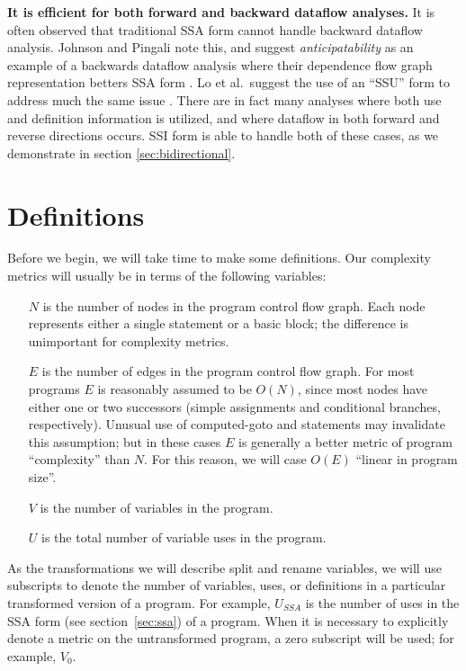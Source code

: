 \documentclass[12pt,titlepage,twoside]{article}
\let\oldsection\section
\renewcommand{\section}{\setcounter{figure}{0}\setcounter{table}{0}\oldsection}
\begin{document}
\textbf{It is efficient for both forward and backward dataflow analyses.}
It is often observed that traditional SSA form cannot handle backward
dataflow analysis.  Johnson and Pingali note this, and suggest
\emph{anticipatability} as an example of a backwards dataflow analysis
where their dependence flow graph representation betters SSA form
\cite{johnson93:dfg}. Lo et al.\ suggest the use of an ``SSU'' form to
address much the same issue \cite{lo98:ssu}.  There are in fact many
analyses where both use and definition information is utilized, and
where dataflow in both forward and reverse directions occurs.  SSI
form is able to handle both of these cases, as we demonstrate in
section \ref{sec:bidirectional}.

\section{Definitions}\label{sec:defs}
Before we begin, we will take time to make some definitions.
Our complexity metrics will usually be in terms of the following
variables:
\begin{itemize}
\item[$N$] is the number of nodes in the program control flow graph.
Each node represents either a single statement or a basic block; the
difference is unimportant for complexity metrics.
\item[$E$] is the number of edges in the program control flow graph.
For most programs $E$ is reasonably assumed to be $O(N)$, since most
nodes have either one or two successors (simple assignments and
conditional branches, respectively).  Unusual use of computed-goto and
 statements may invalidate this assumption; but in these
cases $E$ is generally a better metric of program ``complexity'' than
$N$.  For this reason, we will case $O(E)$ ``linear in program size''.
\item[$V$] is the number of variables in the program.
\item[$U$] is the total number of variable uses in the program.
\end{itemize}
As the transformations we will describe split and rename variables, we
will use subscripts to denote the number of variables, uses, or
definitions in a particular transformed version of a program.  For
example, $U_{SSA}$ is the number of uses in the SSA form (see
section~\ref{sec:ssa}) of a program.  When it is necessary to
explicitly denote a metric on the untransformed program, a zero
subscript will be used; for example, $V_0$.
\end{document}
